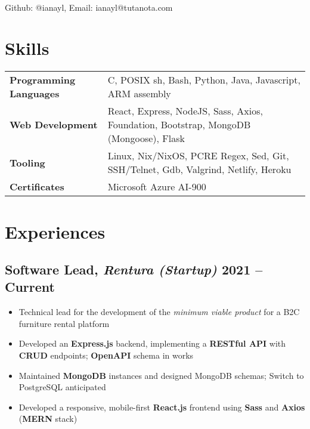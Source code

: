 \documentclass[9pt]{article}
\author{Ian Li}
\makeatletter
\renewcommand{\maketitle}{
		\vspace{-4em}
		{\huge\bfseries
		\theauthor}
    \vspace{0.2em}
    \\
    Github: @ianayl, Email: ianayl@tutanota.com
}
\makeatother
\begin{document}
\maketitle


\section{Skills}

\begin{tabular}{ l l }
    \textbf{Programming Languages} & C, POSIX sh, Bash, Python, Java, Javascript, ARM assembly \\
    \textbf{Web Development} & React, Express, NodeJS, Sass, Axios, Foundation, Bootstrap, MongoDB (Mongoose), Flask \\
    \textbf{Tooling} & Linux, Nix/NixOS, PCRE Regex, Sed, Git, SSH/Telnet, Gdb, Valgrind, Netlify, Heroku \\
    \textbf{Certificates} & Microsoft Azure AI-900
\end{tabular}

\section*{Experiences}

\subsection{Software Lead, \textit{Rentura (Startup)} \hfill \normalsize\textnormal{2021 -- Current}}
\begin{itemize}
  \item Technical lead for the development of the \textit{minimum viable product} for a B2C furniture rental platform
  \item Developed an \textbf{Express.js} backend, implementing a \textbf{RESTful API} with \textbf{CRUD} endpoints; \textbf{OpenAPI} schema in works
  \item Maintained \textbf{MongoDB} instances and designed MongoDB schemas; Switch to PostgreSQL anticipated
  \item Developed a responsive, mobile-first \textbf{React.js} frontend using \textbf{Sass} and \textbf{Axios} (\textbf{MERN} stack)
\end{itemize}
\end{document}
